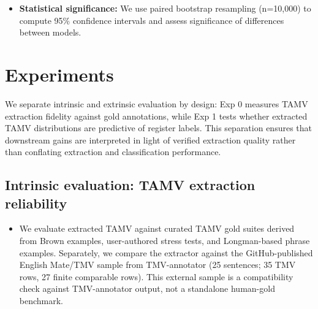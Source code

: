 \documentclass[11pt]{article}
\begin{document}
\begin{itemize}
\begin{itemize}
      \item \emph{Intrinsic:} Curated TAMV gold suites plus a separate compatibility comparison against the GitHub-published TMV-annotator Mate sample.
      \item \emph{Register:} Majority-class baseline and bag-of-words logistic regression.
      \item \emph{Toxicity:} Majority-class baseline and lexicon-based approaches.
      \item \emph{VAD:} Mean-value baseline and lexicon-only regression.
    \end{itemize}
  \item \textbf{Statistical significance:} We use paired bootstrap resampling (n=10,000) to compute 95\% confidence intervals and assess significance of differences between models.
\end{itemize}

\section{Experiments}
We separate intrinsic and extrinsic evaluation by design: Exp 0 measures TAMV extraction fidelity against gold annotations, while Exp 1 tests whether extracted TAMV distributions are predictive of register labels. This separation ensures that downstream gains are interpreted in light of verified extraction quality rather than conflating extraction and classification performance.

\subsection{Intrinsic evaluation: TAMV extraction reliability}
\begin{itemize}
  \item We evaluate extracted TAMV against curated TAMV gold suites derived from Brown examples, user-authored stress tests, and Longman-based phrase examples. Separately, we compare the extractor against the GitHub-published English Mate/TMV sample from TMV-annotator (25 sentences; 35 TMV rows, 27 finite comparable rows). This external sample is a compatibility check against TMV-annotator output, not a standalone human-gold benchmark. \citep{Biber20101999LongmanEnglish,Ramm2017AnnotatingGerman}
\end{itemize}
\end{document}

